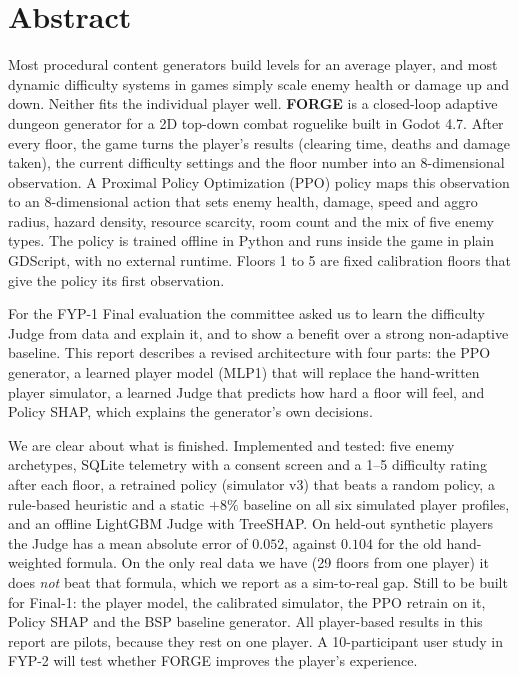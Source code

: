\chapter*{Abstract}

Most procedural content generators build levels for an average player, and most dynamic difficulty systems in games simply scale enemy health or damage up and down. Neither fits the individual player well. \textbf{FORGE} is a closed-loop adaptive dungeon generator for a 2D top-down combat roguelike built in Godot 4.7. After every floor, the game turns the player's results (clearing time, deaths and damage taken), the current difficulty settings and the floor number into an 8-dimensional observation. A Proximal Policy Optimization (PPO) policy maps this observation to an 8-dimensional action that sets enemy health, damage, speed and aggro radius, hazard density, resource scarcity, room count and the mix of five enemy types. The policy is trained offline in Python and runs inside the game in plain GDScript, with no external runtime. Floors 1 to 5 are fixed calibration floors that give the policy its first observation.

For the FYP-1 Final evaluation the committee asked us to learn the difficulty Judge from data and explain it, and to show a benefit over a strong non-adaptive baseline. This report describes a revised architecture with four parts: the PPO generator, a learned player model (MLP1) that will replace the hand-written player simulator, a learned Judge that predicts how hard a floor will feel, and Policy SHAP, which explains the generator's own decisions.

We are clear about what is finished. Implemented and tested: five enemy archetypes, SQLite telemetry with a consent screen and a 1--5 difficulty rating after each floor, a retrained policy (simulator v3) that beats a random policy, a rule-based heuristic and a static $+8\%$ baseline on all six simulated player profiles, and an offline LightGBM Judge with TreeSHAP. On held-out synthetic players the Judge has a mean absolute error of $0.052$, against $0.104$ for the old hand-weighted formula. On the only real data we have (29 floors from one player) it does \emph{not} beat that formula, which we report as a sim-to-real gap. Still to be built for Final-1: the player model, the calibrated simulator, the PPO retrain on it, Policy SHAP and the BSP baseline generator. All player-based results in this report are pilots, because they rest on one player. A 10-participant user study in FYP-2 will test whether FORGE improves the player's experience.
